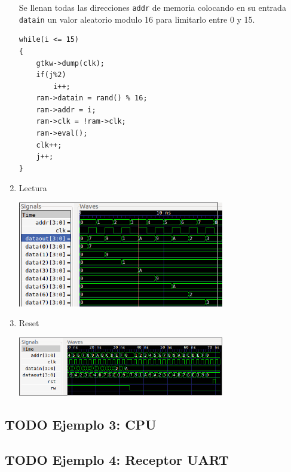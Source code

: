 \documentclass[11pt]{/home/hao/dev/org/latex-plantilla/IEEEtran}
\begin{document}
\begin{enumerate}
Se llenan todas las direcciones \texttt{addr} de memoria colocando en su
entrada \texttt{datain} un valor aleatorio modulo 16 para limitarlo
entre 0 y 15.
\begin{verbatim}
while(i <= 15)
{
    gtkw->dump(clk);
    if(j%2)
        i++;
    ram->datain = rand() % 16;
    ram->addr = i;
    ram->clk = !ram->clk;
    ram->eval();
    clk++;
    j++;
}
\end{verbatim}
\item Lectura
\label{sec:orgfbd5eeb}
\begin{center}
\includegraphics[width=9cm]{data/b1/bb507c-4cfa-404e-bf25-9e3a67321466/screenshot-20170328-102545.png}
\end{center}
\item Reset
\label{sec:orge5b378f}
\begin{center}
\includegraphics[width=9cm]{data/c9/deffbd-c88e-4470-adce-81f482ababd4/screenshot-20170405-000909.png}
\end{center}
\end{enumerate}


\subsection{{\bfseries\sffamily TODO} Ejemplo 3: CPU}
\label{sec:org105a531}

\subsection{{\bfseries\sffamily TODO} Ejemplo 4: Receptor UART}
\label{sec:org6887da7}



\end{document}
